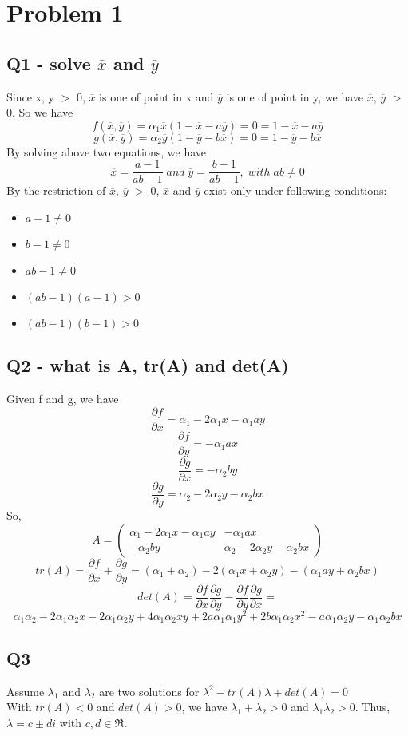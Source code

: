 \documentclass [12pt] {article}
\begin{document}
	\section {Problem 1}
	\subsection {Q1 - solve $\overline{x}$ and $\overline{y}$}
	Since x, y $>$ 0, $\overline{x}$ is one of point in x and $\overline{y}$ is one of point in y, we have $\overline{x}$, $\overline{y}$ $>$ 0. So we have
	\[f(\overline{x}, \overline{y}) = \alpha_1\overline{x}(1-\overline{x}-a\overline{y})=0=1-\overline{x}-a\overline{y}\]
	\[g(\overline{x}, \overline{y}) = \alpha_2\overline{y}(1-\overline{y}-b\overline{x})=0=1-\overline{y}-b\overline{x}\]
	By solving above two equations, we have
	\[\overline{x} = \frac{a-1}{ab-1} \;and \;\overline{y} = \frac{b-1}{ab-1}, \;with \;ab\neq 0\]
	By the restriction of $\overline{x}$, $\overline{y}$ $>$ 0, $\overline{x}$ and $\overline{y}$ exist only under following conditions:
	\begin {itemize}
		\item $a-1 \neq 0$
		\item $b-1 \neq 0$
		\item $ab-1 \neq 0$
		\item $(ab-1)(a-1) > 0$
		\item $(ab-1)(b-1) > 0$
	\end {itemize}
	\subsection {Q2 - what is A, tr(A) and det(A)}
	Given f and g, we have
	\[\frac{\partial f}{\partial x} = \alpha_1 - 2\alpha_1x-\alpha_1ay\]
	\[\frac{\partial f}{\partial y} = -\alpha_1ax\]
	\[\frac{\partial g}{\partial x} = -\alpha_2by\]
	\[\frac{\partial g}{\partial y} = \alpha_2 - 2\alpha_2y-\alpha_2bx\]
	So,
	\[A = \left( \begin{array}{cc} \alpha_1-2\alpha_1x-\alpha_1ay & -\alpha_1ax \\ -\alpha_2by & \alpha_2-2\alpha_2y-\alpha_2bx\end{array} \right)\]
	\[tr(A) = \frac{\partial f}{\partial x} + \frac{\partial g}{\partial y} = (\alpha_1+\alpha_2) - 2(\alpha_1x+\alpha_2y)-(\alpha_1ay+\alpha_2bx)\]
	\[det(A) = \frac{\partial f}{\partial x}\frac{\partial g}{\partial y} - \frac{\partial f}{\partial y}\frac{\partial g}{\partial x} = \]
	\[\alpha_1\alpha_2 - 2\alpha_1\alpha_2 x - 2\alpha_1\alpha_2 y + 4\alpha_1\alpha_2 xy + 2a\alpha_1\alpha_1 y^2 + 2b\alpha_1\alpha_2 x^2 - a\alpha_1\alpha_2 y - \alpha_1\alpha_2 bx\]
	\subsection {Q3}
	Assume $\lambda_1$ and $\lambda_2$ are two solutions for $\lambda^2 - tr(A)\lambda+det(A) = 0$\\
	With $tr(A) < 0$ and $det(A) > 0$, we have $\lambda_1+\lambda_2 > 0$ and $\lambda_1\lambda_2 > 0$. Thus, $\lambda = c \pm di$ with $c, d \in \Re.$
\end{document}
